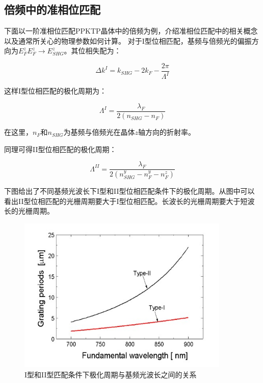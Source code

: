 \documentclass[a4paper,UTF8]{ctexart}
\begin{document}
\subsection{倍频中的准相位匹配}

下面以一阶准相位匹配PPKTP晶体中的倍频为例，介绍准相位匹配中的相关概念以及通常所关心的物理参数如何计算。
对于I型位相匹配，基频与倍频光的偏振方向为$E_{F}^{z}E_{F}^{z} \rightarrow E_{SHG}^{z}$。其位相失配为：

\begin{equation}
    \Delta k^{I } = k_{SHG} - 2k_{F} - \frac{2\pi}{\Lambda ^{I}}
\end{equation}

这样I型位相匹配的极化周期为：

\begin{equation}
    \Lambda^{I} = \frac{\lambda_F}{2(n_{SHG}-n_{F})}
\end{equation}

在这里，$n_F$和$n_{SHG}$为基频与倍频光在晶体$z$轴方向的折射率。

同理可得II型位相匹配的极化周期：

\begin{equation}
    \Lambda^{II} = \frac{\lambda_F}{2(n_{SHG}^y-n_{F}^y-n_{F}^z)}
\end{equation}

下图给出了不同基频光波长下I型和II型位相匹配条件下的极化周期。从图中可以看出II型位相匹配的光栅周期要大于I型位相匹配。长波长的光栅周期要大于短波长的光栅周期。

\begin{figure}[H]
    \centering
    \begin{minipage}[b]{0.9\textwidth}
        \centering
        \includegraphics[width=0.9\textwidth]{./fig3.jpg}
        \caption{I型和II型匹配条件下极化周期与基频光波长之间的关系}
    \end{minipage}
\end{figure}
\end{document}
